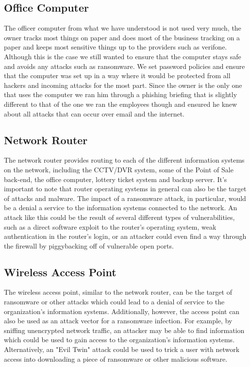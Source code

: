 \documentclass[11pt]{article}
\begin{document}
\subsection{Office Computer}
\label{sec:org6659e95}
The officer computer from what we have understood is not used very much, the owner tracks most things on paper and does most of the business tracking on a paper and keeps most sensitive things up to the providers such as verifone. Although this is the case we still wanted to ensure that the computer stays safe and avoids any attacks such as ransomware. We set password policies and ensure that the computer was set up in a way where it would be protected from all hackers and incoming attacks for the most part. Since the owner is the only one that uses the computer we ran him through a phishing briefing that is slightly different to that of the one we ran the employees though and ensured he knew about all attacks that can occur over email and the internet.

\subsection{Network Router}
\label{sec:org00861f2}
The network router provides routing to each of the different information systems on the network, including the CCTV/DVR system, some of the Point of Sale back-end, the office computer, lottery ticket system and backup server. It's important to note that router operating systems in general can also be the target of attacks and malware. The impact of a ransomware attack, in particular, would be a denial a service to the information systems connected to the network. An attack like this could be the result of several different types of vulnerabilities, such as a direct software exploit to the router's operating system, weak authentication in the router's login, or an attacker could even find a way through the firewall by piggybacking off of vulnerable open ports.

\subsection{Wireless Access Point}
\label{sec:org9530e8a}
The wireless access point, similar to the network router, can be the target of ransomware or other attacks which could lead to a denial of service to the organization's information systems. Additionally, however, the access point can also be used as an attack vector for a ransomware infection. For example, by sniffing unencrypted network traffic, an attacker may be able to find information which could be used to gain access to the organization's information systems. Alternatively, an "Evil Twin" attack could be used to trick a user with network access into downloading a piece of ransomware or other malicious software.
\end{document}
